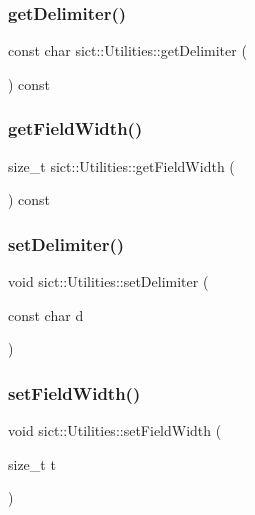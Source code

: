 \subsubsection{\texorpdfstring{getDelimiter()}{getDelimiter()}}
{\footnotesize\ttfamily const char sict\+::\+Utilities\+::get\+Delimiter (\begin{DoxyParamCaption}{ }\end{DoxyParamCaption}) const}

\mbox{\label{classsict_1_1Utilities_a63f80ab99e3b0f5521d64d24366f59ba}} 
\subsubsection{\texorpdfstring{getFieldWidth()}{getFieldWidth()}}
{\footnotesize\ttfamily size\+\_\+t sict\+::\+Utilities\+::get\+Field\+Width (\begin{DoxyParamCaption}{ }\end{DoxyParamCaption}) const}

\mbox{\label{classsict_1_1Utilities_aebf6a66e41ce8de47d0a8aa7a4e6165b}} 
\subsubsection{\texorpdfstring{setDelimiter()}{setDelimiter()}}
{\footnotesize\ttfamily void sict\+::\+Utilities\+::set\+Delimiter (\begin{DoxyParamCaption}\item[{const char}]{d }\end{DoxyParamCaption})\hspace{0.3cm}{\ttfamily [static]}}

\mbox{\label{classsict_1_1Utilities_a3c0800c247dd955f57eff973cbe12b0b}} 
\subsubsection{\texorpdfstring{setFieldWidth()}{setFieldWidth()}}
{\footnotesize\ttfamily void sict\+::\+Utilities\+::set\+Field\+Width (\begin{DoxyParamCaption}\item[{size\+\_\+t}]{t }\end{DoxyParamCaption})}



